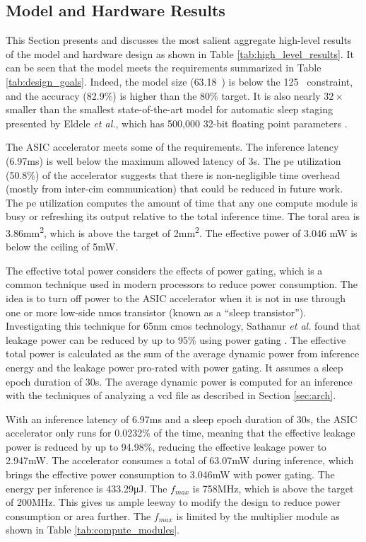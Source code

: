\subsection{Model and Hardware Results}
This Section presents and discusses the most salient aggregate high-level results of the model and hardware design as shown in Table \ref{tab:high_level_results}.
It can be seen that the model meets the requirements summarized in Table \ref{tab:design_goals}. Indeed, the model size (63.18\si{\kilo\byte}) is below the
125\si{\kilo\byte} constraint, and the accuracy (82.9\%) is higher than the 80\% target. It is also nearly $32\times$ smaller than the smallest state-of-the-art
model for automatic sleep staging presented by Eldele \textit{et al.}, which has 500,000 32-bit floating point parameters \cite{eldele2021attention}.

The ASIC accelerator meets some of the requirements. The inference latency (6.97\si{\milli\second}) is well below the maximum allowed latency of 3\si{\second}.
The \ac{pe} utilization (50.8\%) of the accelerator suggests that there is non-negligible time overhead (mostly from inter-\ac{cim} communication) that could be
reduced in future work. The \ac{pe} utilization computes the amount of time that any one compute module is busy or refreshing its output relative to the total inference
time. The toral area is 3.86\si{\square\milli\meter}, which is above the target of 2\si{\square\milli\meter}. The effective power of 3.046 \si{\milli\watt} is below
the ceiling of 5\si{\milli\watt}.

The effective total power considers the effects of power gating, which is a common technique used in modern processors to reduce power consumption. The idea
is to turn off power to the ASIC accelerator when it is not in use through one or more low-side \ac{nmos} transistor (known as a ``sleep transistor''). Investigating
this technique for 65nm \ac{cmos} technology, Sathanur \textit{et al.} found that leakage power can be reduced by up to 95\% using power gating \cite{sathanur2008quantifying}.
The effective total power is calculated as the sum of the average dynamic power from inference energy and the leakage power pro-rated with power gating. It assumes a
sleep epoch duration of 30\si{\second}. The average dynamic power is computed for an inference with the techniques of analyzing a \ac{vcd} file as described in 
Section \ref{sec:arch}.

With an inference latency of 6.97\si{\milli\second} and a sleep epoch duration of 30\si{\second}, the ASIC accelerator only runs for 0.0232\% of the time, meaning
that the effective leakage power is reduced by up to 94.98\%, reducing the effective leakage power to 2.947\si{\milli\watt}. The accelerator consumes a total of
63.07\si{\milli\watt} during inference, which brings the effective power consumption to 3.046\si{\milli\watt} with power gating. The energy per inference is
433.29\si{\micro\joule}. The $f_{max}$ is 758\si{\mega\hertz}, which is above the target of 200\si{\mega\hertz}. This gives us ample leeway to modify the design to reduce
power consumption or area further. The $f_{max}$ is limited by the multiplier module as shown in Table \ref{tab:compute_modules}.

